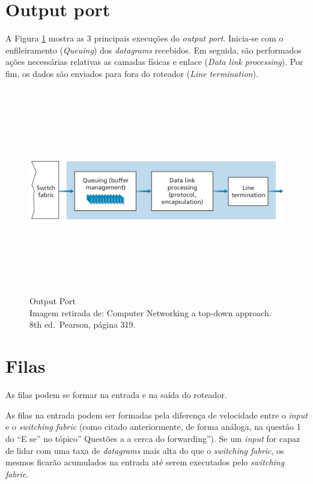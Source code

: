 \hypertarget{output-port}{%
\section{Output port}\label{output-port}}

A Figura \ref{fig:Output Port} mostra as 3 principais execuções do \emph{output port}.
Inicia-se com o enfileiramento (\emph{Queuing}) dos \emph{datagrams}
recebidos. Em seguida, são performados ações necessárias relativas as
camadas físicas e enlace (\emph{Data link processing}). Por fim, os
dados são enviados para fora do roteador (\emph{Line termination}).


\begin{figure}[h!]
\centering
\includegraphics[keepaspectratio, width=12cm, height=9cm]{imagens/14/14 - output port.png}
\caption{Output Port \\
Imagem retirada de: Computer Networking a top-down approach. 8th
ed.~Pearson, página 319. \\}
\label{fig:Output Port}
\end{figure}


\hypertarget{filas}{%
\section{Filas}\label{filas}}

As filas podem se formar na entrada e na saída do roteador.

As filas na entrada podem ser formadas pela diferença de velocidade
entre o \emph{input} e o \emph{switching fabric} (como citado
anteriormente, de forma análoga, na questão 1 do ``E se'' no tópico''
Questões a a cerca do forwarding''). Se um \emph{input} for capaz de
lidar com uma taxa de \emph{datagrams} mais alta do que o
\emph{switching fabric}, os mesmos ficarão acumulados na entrada até
serem executados pelo \emph{switching fabric}.

